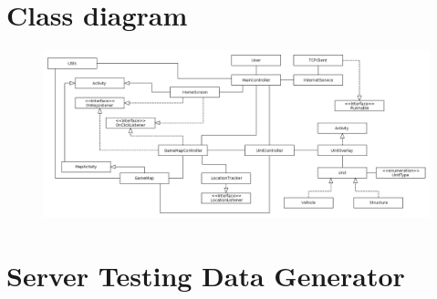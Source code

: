\chapter{Class diagram}\label{ap_class}

\begin{figure}[H]
  \centering
  \includegraphics[height=0.3\textheight, angle=90]{Images/diagrams/class.png}
\end{figure}



\chapter{Server Testing Data Generator}\label{ap_class}

